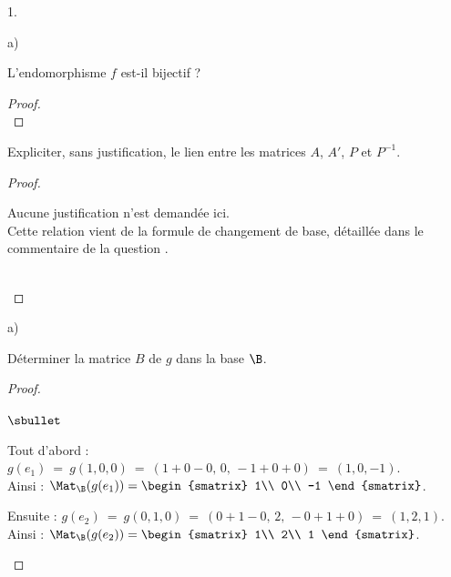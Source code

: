 \begin{noliste}{1.}
\begin{noliste}{a)}
    
    \item L'endomorphisme $f$ est-il bijectif ?
    
    \begin{proof}~
      ~\\[-1cm]
    \end{proof}

    
    \item Expliciter, sans justification, le lien entre les matrices 
    $A$, $A'$, $P$ et $P^{-1}$.
    
    \begin{proof}~
      
      \begin{remark}
        Aucune justification n'est demandée ici.\\
        Cette relation vient de la formule de changement de base, 
        détaillée dans le commentaire de la question .
      \end{remark}~\\[-1.4cm]
    \end{proof}
  \end{noliste}
  
  \item 
  \begin{noliste}{a)}
    \setlength{\itemsep}{2mm}
    \item Déterminer la matrice $B$ de $g$ dans la base $\B$.
    
    \begin{proof}~
      \begin{noliste}{$\sbullet$}
	\item Tout d'abord : $g(e_1) \ = \ g(1,0,0) \ = \ (1+0-0, \, 0, 
	\, -1+0+0) \ = \ (1,0,-1)$. \\[.1cm]
	Ainsi : $\Mat_\B(g(e_1)) = 
	\begin{smatrix}
	  1\\
	  0\\
	  -1
	\end{smatrix}$.
	
	\item Ensuite : $g(e_2) \ = \ g(0,1,0) \ = \ (0+1-0, \, 2, \, -0
	+1+0) \ = \ (1,2,1)$. \\[.1cm]
	Ainsi : $\Mat_\B(g(e_2)) = 
	\begin{smatrix}
	  1\\
	  2\\
	  1
	\end{smatrix}$.
	

\end{noliste}
\end{proof}
\end{noliste}
\end{noliste}
